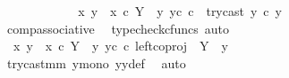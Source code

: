 \begin{isabellebody}
\ \ \ \ \ \ \ \ \isamarkupfalse%
\ \isamarkupfalse%
\ {\isachardoublequoteopen}{\isachardot}{\kern0pt}{\isachardot}{\kern0pt}{\isachardot}{\kern0pt}\ {\isacharequal}{\kern0pt}\ {\isacharparenleft}{\kern0pt}{\isasymlangle}x{}{\isacharcomma}{\kern0pt}\ y{}{\isasymrangle}\ {\isasymamalg}\ {\isasymlangle}x{}\ {\isasymcirc}\isactrlsub c\ {\isasymbeta}\isactrlbsub Y\ {\isasymsetminus}\ {\isacharparenleft}{\kern0pt}{\isasymone}{\isacharcomma}{\kern0pt}y{}{\isacharparenright}{\kern0pt}\isactrlesub {\isacharcomma}{\kern0pt}\ y{}\isactrlsup c{\isasymrangle}{\isacharparenright}{\kern0pt}\ {\isasymcirc}\isactrlsub c\ \ try{\isacharunderscore}{\kern0pt}cast\ y{}\ {\isasymcirc}\isactrlsub c\ y{}{\isachardoublequoteclose}\isanewline
\ \ \ \ \ \ \ \ \ \ \isamarkupfalse%
\ \ comp{\isacharunderscore}{\kern0pt}associative{}\ \isamarkupfalse%
\ {\isacharparenleft}{\kern0pt}typecheck{\isacharunderscore}{\kern0pt}cfuncs{\isacharcomma}{\kern0pt}\ auto{\isacharparenright}{\kern0pt}\isanewline
\ \ \ \ \ \ \ \ \isamarkupfalse%
\ \isamarkupfalse%
\ {\isachardoublequoteopen}{\isachardot}{\kern0pt}{\isachardot}{\kern0pt}{\isachardot}{\kern0pt}\ {\isacharequal}{\kern0pt}\ {\isacharparenleft}{\kern0pt}{\isasymlangle}x{}{\isacharcomma}{\kern0pt}\ y{}{\isasymrangle}\ {\isasymamalg}\ {\isasymlangle}x{}\ {\isasymcirc}\isactrlsub c\ {\isasymbeta}\isactrlbsub Y\ {\isasymsetminus}\ {\isacharparenleft}{\kern0pt}{\isasymone}{\isacharcomma}{\kern0pt}y{}{\isacharparenright}{\kern0pt}\isactrlesub {\isacharcomma}{\kern0pt}\ y{}\isactrlsup c{\isasymrangle}{\isacharparenright}{\kern0pt}\ {\isasymcirc}\isactrlsub c\ left{\isacharunderscore}{\kern0pt}coproj\ {\isasymone}\ {\isacharparenleft}{\kern0pt}Y\ {\isasymsetminus}\ {\isacharparenleft}{\kern0pt}{\isasymone}{\isacharcomma}{\kern0pt}y{}{\isacharparenright}{\kern0pt}{\isacharparenright}{\kern0pt}{\isachardoublequoteclose}\isanewline
\ \ \ \ \ \ \ \ \ \ \isamarkupfalse%
\ \ try{\isacharunderscore}{\kern0pt}cast{\isacharunderscore}{\kern0pt}m{\isacharunderscore}{\kern0pt}m\ y{}{\isacharunderscore}{\kern0pt}mono\ y{}y{}{\isacharunderscore}{\kern0pt}def{\isacharparenleft}{\kern0pt}{}{\isacharparenright}{\kern0pt}\ \isamarkupfalse%
\ auto\isanewline
\ \ \ \ \ \ \ \ \isamarkupfalse%
\ \isamarkupfalse%

\end{isabellebody}

